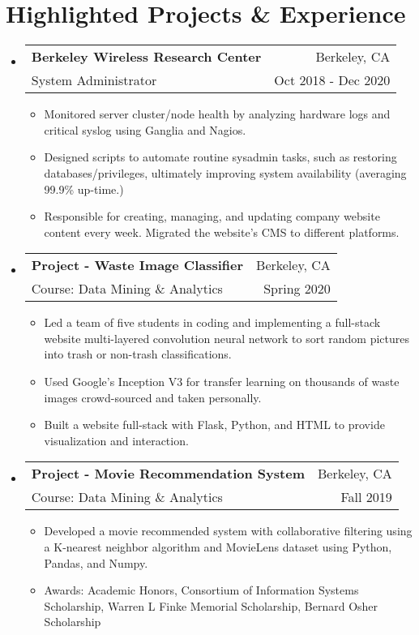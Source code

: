 \documentclass[letterpaper,11pt]{article}
\makeatletter
\newcommand{\resumeSubheading}[4]{
	\vspace{-1pt}\item
	\begin{tabular*}{0.97\textwidth}{l@{\extracolsep{\fill}}r}
		\textbf{#1} & #2 \\
		\small#3 & \small #4 \\
	\end{tabular*}\vspace{-5pt}
}
\newcommand{\resumeSubHeadingListStart}{\begin{itemize}[leftmargin=*]}
\newcommand{\resumeSubHeadingListEnd}{\end{itemize}}
\makeatother
\begin{document}
	\section{Highlighted Projects \& Experience}
	\resumeSubHeadingListStart
	\resumeSubheading
	{Berkeley Wireless Research Center}{Berkeley, CA}
	{System Administrator}{Oct 2018 - Dec 2020}
	\begin{itemize}
		\item
		{Monitored server cluster/node health by analyzing hardware logs and critical syslog using Ganglia and Nagios.}
		\item
		{Designed scripts to automate routine sysadmin tasks, such as restoring databases/privileges, ultimately improving system availability (averaging 99.9\% up-time.)}
		\item
		{Responsible for creating, managing, and updating company website content every week. Migrated the website's CMS to different platforms.}
	\end{itemize}
	
	\resumeSubheading
	{Project - Waste Image Classifier}{Berkeley, CA}
	{Course: Data Mining \& Analytics}{Spring 2020}
	\begin{itemize}
		\item	{Led a team of five students in coding and implementing a full-stack website multi-layered convolution neural network to sort random pictures into trash or non-trash classifications.}
		\item	{Used Google's Inception V3 for transfer learning on thousands of waste images crowd-sourced and taken personally.}
		\item {Built a website full-stack with Flask, Python, and HTML to provide visualization and interaction.}
	\end{itemize}
	\resumeSubheading
	{Project - Movie Recommendation System}{Berkeley, CA}
	{Course: Data Mining \& Analytics}{Fall 2019}
	\begin{itemize}
		\item	{Developed a movie recommended system with collaborative filtering using a K-nearest neighbor algorithm and MovieLens dataset using Python, Pandas, and Numpy.}
		\item{Awards: Academic Honors, Consortium of Information Systems Scholarship, Warren L Finke Memorial Scholarship, Bernard Osher Scholarship}
	\end{itemize}
	\resumeSubHeadingListEnd
	
	
\end{document}
